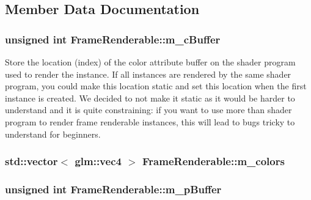 \subsection{Member Data Documentation}
\hypertarget{classFrameRenderable_a6c8bed148c506c1a26fd7fc3cc5c625a}{
\subsubsection[{m\+\_\+c\+Buffer}]{\setlength{\rightskip}{0pt plus 5cm}unsigned int Frame\+Renderable\+::m\+\_\+c\+Buffer\hspace{0.3cm}{\ttfamily [private]}}}\label{classFrameRenderable_a6c8bed148c506c1a26fd7fc3cc5c625a}
Store the location (index) of the color attribute buffer on the shader program used to render the instance. If all instances are rendered by the same shader program, you could make this location static and set this location when the first instance is created. We decided to not make it static as it would be harder to understand and it is quite constraining\+: if you want to use more than shader program to render frame renderable instances, this will lead to bugs tricky to understand for beginners. \hypertarget{classFrameRenderable_a95e44e90b8e1f1ac67967003aea63009}{
\subsubsection[{m\+\_\+colors}]{\setlength{\rightskip}{0pt plus 5cm}std\+::vector$<$ glm\+::vec4 $>$ Frame\+Renderable\+::m\+\_\+colors\hspace{0.3cm}{\ttfamily [private]}}}\label{classFrameRenderable_a95e44e90b8e1f1ac67967003aea63009}
\hypertarget{classFrameRenderable_a89c0e4abd391a47198729001a2d5f159}{
\subsubsection[{m\+\_\+p\+Buffer}]{\setlength{\rightskip}{0pt plus 5cm}unsigned int Frame\+Renderable\+::m\+\_\+p\+Buffer\hspace{0.3cm}{\ttfamily [private]}}}\label{classFrameRenderable_a89c0e4abd391a47198729001a2d5f159}
